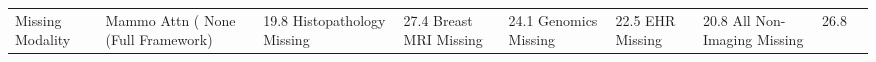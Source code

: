 \begin{tabular}{lllllllll}
\toprule
Missing Modality & Mammo Attn (%
\midrule
None (Full Framework) & 19.8%
Histopathology Missing & 27.4%
Breast MRI Missing & 24.1%
Genomics Missing & 22.5%
EHR Missing & 20.8%
All Non-Imaging Missing & 26.8%
\bottomrule
\end{tabular}
